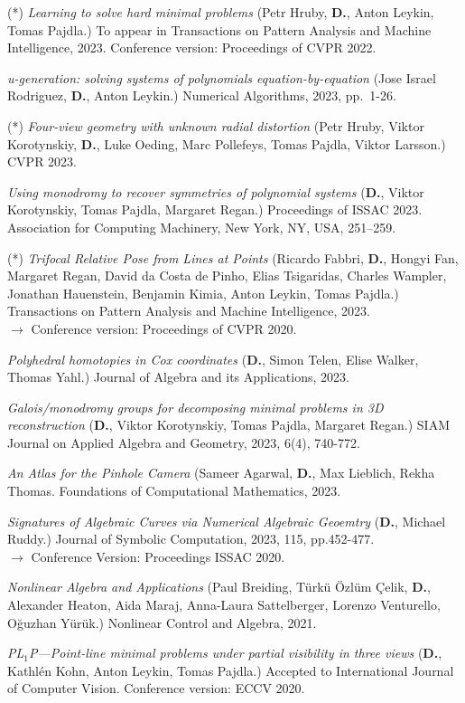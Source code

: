 \documentclass[margin,line,pifont,palatino,courier]{res}
\newcommand{\D}{\textbf{D.}}
\begin{document}
\begin{resume}
(*) \textit{Learning to solve hard minimal problems}
(Petr Hruby, \D, Anton Leykin, Tomas Pajdla.)
To appear in Transactions on Pattern Analysis and Machine Intelligence, 2023. Conference version: Proceedings of CVPR 2022.


\textit{u-generation: solving systems of polynomials equation-by-equation}
(Jose Israel Rodriguez, \D, Anton Leykin.)
Numerical Algorithms, 2023, pp.~1-26.

(*) \textit{Four-view geometry with unknown radial distortion}
(Petr Hruby, Viktor Korotynskiy, \D, Luke Oeding, Marc Pollefeys, Tomas Pajdla, Viktor Larsson.)
CVPR 2023.

\textit{Using monodromy to recover symmetries of polynomial systems}
(\D, Viktor Korotynskiy, Tomas Pajdla, Margaret Regan.)
Proceedings of ISSAC 2023. Association for Computing Machinery, New York, NY, USA, 251–259.

(*) \textit{Trifocal Relative Pose from Lines at Points}
    (Ricardo Fabbri, \D, Hongyi Fan, Margaret Regan, David da Costa de Pinho, Elias Tsigaridas, Charles Wampler, Jonathan Hauenstein, Benjamin Kimia, Anton Leykin, Tomas Pajdla.)\\
    Transactions on Pattern Analysis and Machine Intelligence, 2023.\\
    $\rightarrow $ Conference version: Proceedings of CVPR 2020.

\textit{Polyhedral homotopies in Cox coordinates}
(\D, Simon Telen, Elise Walker, Thomas Yahl.) 
Journal of Algebra and its Applications, 2023.

\textit{Galois/monodromy groups for decomposing minimal problems in 3D reconstruction}
(\D, Viktor Korotynskiy, Tomas Pajdla, Margaret Regan.) 
SIAM Journal on Applied Algebra and Geometry, 2023, 6(4), 740-772.

\textit{An Atlas for the Pinhole Camera}
(Sameer Agarwal, \D, Max Lieblich, Rekha Thomas.
Foundations of Computational Mathematics, 2023.

\textit{Signatures of Algebraic Curves via Numerical Algebraic Geoemtry}
(\D, Michael Ruddy.) 
Journal of Symbolic Computation, 2023, 115, pp.452-477.\\
$\rightarrow $ Conference Version: Proceedings ISSAC 2020.


\textit{Nonlinear Algebra and Applications }
(Paul Breiding, Türkü Özlüm Çelik, \D, Alexander Heaton, Aida Maraj, Anna-Laura Sattelberger, Lorenzo Venturello, Oğuzhan Yürük.)
Nonlinear Control and Algebra, 2021.

\textit{PL$_1$P---Point-line minimal problems under partial visibility in three views}
(\D, Kathlén Kohn, Anton Leykin, Tomas Pajdla.) Accepted to International Journal of Computer Vision.
Conference version: ECCV 2020.


\end{resume}
\end{document}

